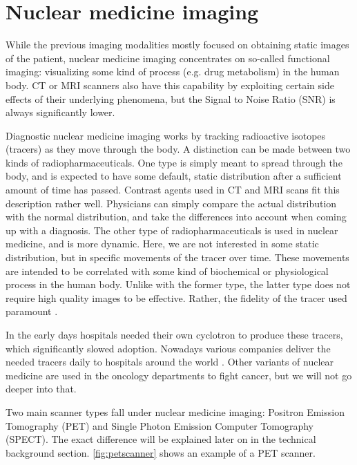 \section{Nuclear medicine imaging}\label{chap:nuclearimg}
While the previous imaging modalities mostly focused on obtaining static images
of the patient, nuclear medicine imaging concentrates on so-called functional
imaging: visualizing some kind of process (e.g. drug metabolism) in the human
body. CT or MRI scanners also have this capability by exploiting certain side
effects of their underlying phenomena, but the Signal to Noise Ratio (SNR) is
always significantly lower.

Diagnostic nuclear medicine imaging works by tracking radioactive isotopes
(tracers) as they move through the body. A distinction can be made between two
kinds of radiopharmaceuticals. One type is simply meant to spread through the
body, and is expected to have some default, static distribution after a
sufficient amount of time has passed. Contrast agents used in CT and MRI scans
fit this description rather well. Physicians can simply compare the actual
distribution with the normal distribution, and take the differences into account
when coming up with a diagnosis. The other type of radiopharmaceuticals is used
in nuclear medicine, and is more dynamic. Here, we are not interested in some
static distribution, but in specific movements of the tracer over time. These
movements are intended to be correlated with some kind of biochemical or
physiological process in the human body. Unlike with the former type, the latter
type does not require high quality images to be effective. Rather, the fidelity
of the tracer used paramount \cite{radiopharma}.

In the early days hospitals needed their own cyclotron to produce these tracers,
which significantly slowed adoption. Nowadays various companies deliver the
needed tracers daily to hospitals around the world \cite{petreview}. Other
variants of nuclear medicine are used in the oncology departments to fight
cancer, but we will not go deeper into that.

Two main scanner types fall under nuclear medicine imaging: Positron Emission
Tomography (PET) and Single Photon Emission Computer Tomography (SPECT). The
exact difference will be explained later on in the technical background section.
\autoref{fig:petscanner} shows an example of a PET scanner.

